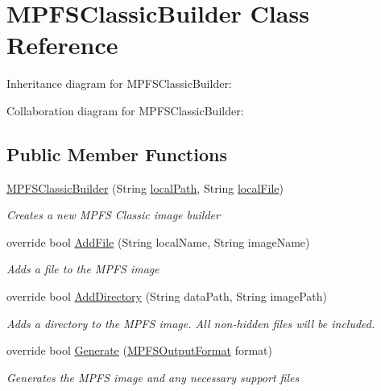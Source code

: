 \hypertarget{class_microchip_1_1_m_p_f_s_classic_builder}{}\section{M\+P\+F\+S\+Classic\+Builder Class Reference}
\label{class_microchip_1_1_m_p_f_s_classic_builder}


Inheritance diagram for M\+P\+F\+S\+Classic\+Builder\+:


Collaboration diagram for M\+P\+F\+S\+Classic\+Builder\+:
\subsection*{Public Member Functions}
\begin{DoxyCompactItemize}
\item 
\hyperlink{class_microchip_1_1_m_p_f_s_classic_builder_a0509e1176f43c5b94e3af0cd80cf6a81}{M\+P\+F\+S\+Classic\+Builder} (String \hyperlink{class_microchip_1_1_m_p_f_s_builder_a50bcab31eeaf73bd5975d595d2bbe8cf}{local\+Path}, String \hyperlink{class_microchip_1_1_m_p_f_s_builder_ab110f2474a6be5f43ee032058d6ddd65}{local\+File})
\begin{DoxyCompactList}\small\item\em Creates a new M\+P\+F\+S Classic image builder \end{DoxyCompactList}\item 
override bool \hyperlink{class_microchip_1_1_m_p_f_s_classic_builder_aabf44779c0c6c813d9d25aa890fae0cf}{Add\+File} (String local\+Name, String image\+Name)
\begin{DoxyCompactList}\small\item\em Adds a file to the M\+P\+F\+S image \end{DoxyCompactList}\item 
override bool \hyperlink{class_microchip_1_1_m_p_f_s_classic_builder_afed308f440de4af9b943d9e0bb4e4ced}{Add\+Directory} (String data\+Path, String image\+Path)
\begin{DoxyCompactList}\small\item\em Adds a directory to the M\+P\+F\+S image. All non-\/hidden files will be included. \end{DoxyCompactList}\item 
override bool \hyperlink{class_microchip_1_1_m_p_f_s_classic_builder_a6b6e569a945c1c9c3e59c93a353f006b}{Generate} (\hyperlink{namespace_microchip_aa4ebbf0f9a9e92e601f6a9aac07b5e1e}{M\+P\+F\+S\+Output\+Format} format)
\begin{DoxyCompactList}\small\item\em Generates the M\+P\+F\+S image and any necessary support files \end{DoxyCompactList}\end{DoxyCompactItemize}
